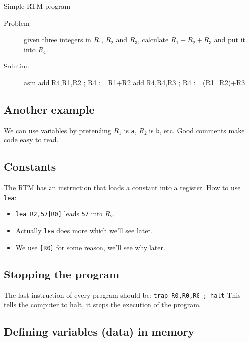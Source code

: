 \begin{highlight}{Simple RTM program}
	\begin{description}
		\item[Problem] given three integers in \(R_1\), \(R_2\) and \(R_3\), calculate  \(R_1+R_2+R_3\) and put it into \(R_4\).
		\item[Solution]

			\begin{code}{asm}
				add R4,R1,R2 ; R4 := R1+R2
				add R4,R4,R3 ; R4 := (R1_R2)+R3
			\end{code}
	\end{description}
\end{highlight}

\subsection{Another example}\label{sub:another_example}

We can use variables by pretending \(R_1\) is  \texttt{a}, \(R_2\) is \texttt{b}, etc.
Good comments make code easy to read.

\subsection{Constants}\label{sub:constants}

The RTM has an instruction that loads a constant into a register.
How to use \texttt{lea}:
\begin{itemize}
	\item \texttt{lea R2,57[R0]} leads \texttt{57} into \(R_2\).
	\item Actually \texttt{lea} does more which we'll see later.
	\item We use \texttt{[R0]} for some reason, we'll see why later.
\end{itemize}

\subsection{Stopping the program}\label{sub:stopping_the_program}

The last instruction of every program should be: \texttt{trap R0,R0,R0 ; halt}
This tells the computer to halt, it stops the execution of the program.

\subsection{Defining variables (data) in memory}\label{sub:defining_variables_data_in_memory}

